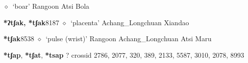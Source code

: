 \begin{list}{}{\leftmargin=1.5em \itemindent=-1.5em}
\hspace{1ex}
         $\diamond$~`boar'
         Rangoon 
\hspace{1ex}
         Atsi 
\hspace{1ex}
         Bola 
  \item {\footnotesize \textbf{*ʔtʃak, *tʃak}}{\tiny 8187}
\hspace{1ex}
         $\diamond$~`placenta'
         Achang\_Longchuan 
\hspace{1ex}
         Xiandao 
  \item {\footnotesize \textbf{*tʃak}}{\tiny 8538}
\hspace{1ex}
         $\diamond$~`pulse (wrist)'
         Rangoon 
\hspace{1ex}
         Achang\_Longchuan 
\hspace{1ex}
         Atsi 
\hspace{1ex}
         Maru 
  \end{list}
\item
\textbf{*tʃap}, \textbf{*tʃat}, \textbf{*tsap}
?
  {\tiny crossid 2786, 2077, 320, 389, 2133, 5587, 3010, 2078, 8993}

